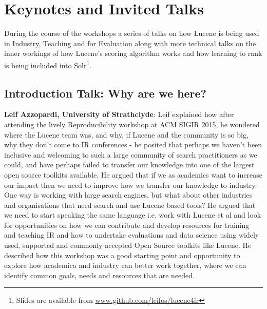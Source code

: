 \section{Keynotes and Invited Talks}
During the course of the workshops a series of talks on how Lucene is being used in Industry, Teaching and for Evaluation along with more technical talks on the inner workings of how Lucene's scoring algorithm works and how learning to rank is being included into Solr\footnote{\scriptsize{Slides are available from \url{www.github.com/leifos/lucene4ir}}}. 

\subsection*{Introduction Talk: Why are we here?}
{\bf Leif Azzopardi, University of Strathclyde}:
Leif explained how after attending the lively Reproducibility workshop at ACM SIGIR 2015, he wondered where the Lucene team was, and why, if Lucene and the community is so big, why they don't come to IR conferences - he posited that perhaps we haven't been inclusive and welcoming to such a large community of search practitioners as we could, and have perhaps failed to transfer our knowledge into one of the largest open source toolkits available. He argued that if we as academics want to increase our impact then we need to improve how we transfer our knowledge to industry. One way is working with large search engines, but what about other industries and organisations that need search and use Lucene based tools? He argued that we need to start speaking the same language i.e. work with Lucene et al and look for opportunities on how we can contribute and develop resources for training and teaching IR and how to undertake evaluations and data science using widely used, supported and commonly accepted Open Source toolkits like Lucene. He described how this workshop was a good starting point and opportunity to explore how academica and industry can better work together, where we can identify common goals, needs and resources that are needed. 














